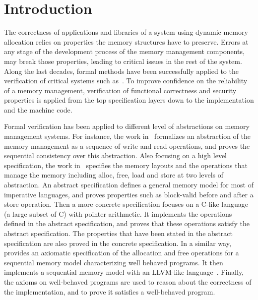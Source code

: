 \section{Introduction}
The correctness of applications and libraries of a system using dynamic memory allocation relies on properties the memory structures have to preserve. Errors at any stage of the development process of the memory management components, may break those properties, leading to critical issues in the rest of the system. Along the last decades, formal methods have been successfully applied to the verification of critical systems such as~\cite{reg_rushby, reg_luu}. To improve confidence on the reliability of a memory management, verification of functional correctness and security properties is applied from the top specification layers down to the implementation and the machine code.

Formal verification has been applied to different level of abstractions on memory management systems. For instance, the work in~\cite{reg_higham} formalizes an abstraction of the memory management as a sequence of write and read operations, and proves the sequential consistency over this abstraction. Also focusing on a high level specification, the work in~\cite{reg_blazy} specifies the memory layouts and the operations that manage the memory including alloc, free, load and store at two levels of abstraction. An abstract specification defines a general memory model for most of imperative languages, and proves properties such as block-valid before and after a store operation. Then a more concrete specification focuses on a C-like language (a large subset of C) with pointer arithmetic. It implements the operations defined in the abstract specification, and proves that these operations satisfy the abstract specification. The properties that have been stated in the abstract specification are also proved in the concrete specification. In a similar way,~\cite{reg_mansky} provides an axiomatic specification of the allocation and free operations for a sequential memory model characterizing well behaved programs. It then implements a sequential memory model with an LLVM-like language~\cite{reg_chris}. Finally, the axioms on well-behaved programs are used to reason about the correctness of the implementation, and to prove it satisfies a well-behaved program.


